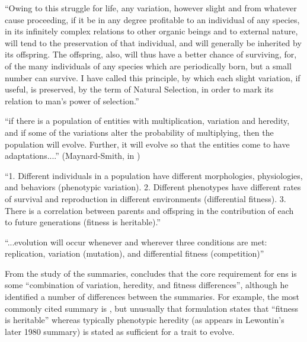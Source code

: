 \begin{compactenum}
\item ``Owing to this struggle for life, any variation, however slight and from whatever cause proceeding, if it be in any degree profitable to an individual of any species, in its infinitely complex relations to other organic beings and to external nature, will tend to the preservation of that individual, and will generally be inherited by its offspring. The offspring, also, will thus have a better chance of surviving, for, of the many individuals of any species which are periodically born, but a small number can survive. I have called this principle, by which each slight variation, if useful, is preserved, by the term of Natural Selection, in order to mark its relation to man's power of selection.'' \cite{Darwin1859}

\item ``if there is a population of entities with multiplication, variation and heredity, and if some of the variations alter the probability of multiplying, then the population will evolve. Further, it will evolve so that the entities come to have adaptations....'' (Maynard-Smith, in \cite{Griesemer2001})

\item ``1. Different individuals in a population have different morphologies, physiologies, and behaviors (phenotypic variation). 2. Different phenotypes have different rates of survival and reproduction in different environments (differential fitness). 3. There is a correlation between parents and offspring in the contribution of each to future generations (fitness is heritable).'' \cite{Lewontin:1970mc}

\item ``...evolution will occur whenever and wherever three conditions are met: replication, variation (mutation), and differential fitness (competition)'' \parencite[quoting Daniel Dennett]{Ofria2004}

\end{compactenum}

From the study of the summaries, \cite{Godfrey-Smith2007} concludes that the core requirement for \gls{ens} is some ``combination of variation, heredity, and fitness differences'', although he identified a number of differences between the summaries. For example, the most commonly cited summary is \cite{Lewontin:1970mc}, but unusually that formulation states that ``fitness is heritable'' whereas typically phenotypic heredity (as appears in Lewontin's later 1980 summary) is stated as sufficient for a trait to evolve. 

